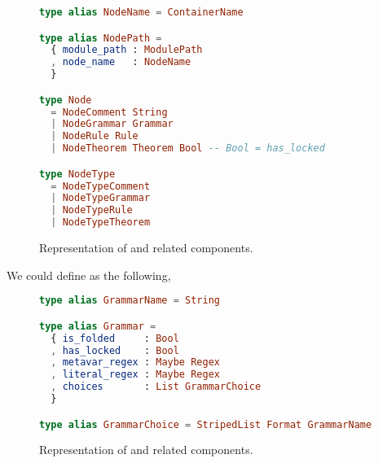\documentclass[master.tex]{subfiles}
\begin{document}
\begin{figure}[H]
\begin{framed}
\begin{lstlisting}[language=elm]
type alias NodeName = ContainerName

type alias NodePath =
  { module_path : ModulePath
  , node_name   : NodeName
  }

type Node
  = NodeComment String
  | NodeGrammar Grammar
  | NodeRule Rule
  | NodeTheorem Theorem Bool -- Bool = has_locked

type NodeType
  = NodeTypeComment
  | NodeTypeGrammar
  | NodeTypeRule
  | NodeTypeTheorem
\end{lstlisting}
\end{framed}
\caption{Representation of  and related components.}
\label{fig:implementation-repo-node}
\end{figure}

We could define  as the following,

\begin{figure}[H]
\begin{framed}
\begin{lstlisting}[language=elm]
type alias GrammarName = String

type alias Grammar =
  { is_folded     : Bool
  , has_locked    : Bool
  , metavar_regex : Maybe Regex
  , literal_regex : Maybe Regex
  , choices       : List GrammarChoice
  }

type alias GrammarChoice = StripedList Format GrammarName
\end{lstlisting}
\end{framed}
\caption{Representation of  and related components.}
\label{fig:implementation-repo-grammar}
\end{figure}
\end{document}
